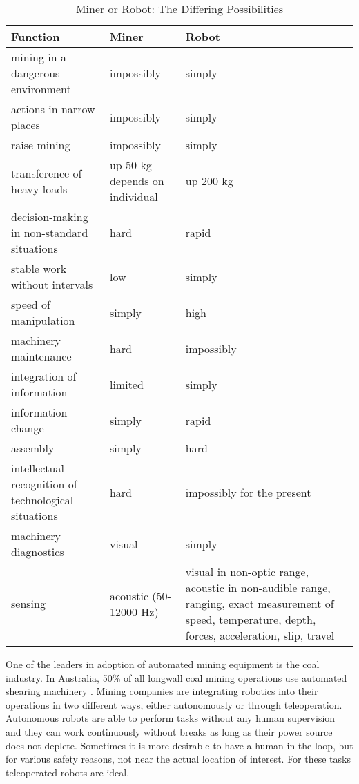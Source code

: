 \begin{center}
\begin{table}[ht!]
\caption[]{Miner or Robot: The Differing Possibilities \cite{table}}
\small
\hfill{}
\resizebox{6.5in}{!} {
\begin{tabular}{p{3in} p{2.5in} p{2in} p{3in}}
\toprule
Function & Miner & Robot\\
\midrule
mining in a dangerous environment & impossibly & simply\\
actions in narrow places & impossibly & simply\\
raise mining & impossibly & simply\\
transference of heavy loads & up 50 kg depends on individual & up 200 kg\\
decision-making in non-standard situations & hard & rapid\\
stable work without intervals & low & simply\\
speed of manipulation & simply & high\\
machinery maintenance & hard & impossibly\\
integration of information & limited & simply\\
information change & simply & rapid\\
assembly & simply & hard\\
intellectual recognition of technological situations & hard & impossibly for the present\\
machinery diagnostics & visual & simply\\
sensing & acoustic (50-12000 Hz) & visual in non-optic range, acoustic in non-audible range, ranging, exact measurement of speed, temperature, depth, forces, acceleration, slip, travel\\
\bottomrule
\end{tabular}
}
\hfill{}
\label{tab:table}
\end{table}
\end{center}

One of the leaders in adoption of automated mining equipment is the coal industry. In Australia, 50\% of all longwall coal mining operations use automated shearing machinery \cite{auswall}. Mining companies are integrating robotics into their operations in two different ways, either autonomously or through teleoperation. Autonomous robots are able to perform tasks without any human supervision and they can work continuously without breaks as long as their power source does not deplete. Sometimes it is more desirable to have a human in the loop, but for various safety reasons, not near the actual location of interest. For these tasks teleoperated robots are ideal.\\

